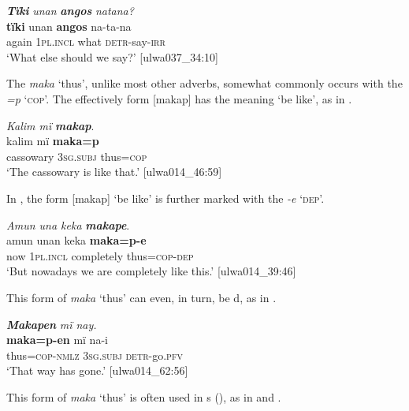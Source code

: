 \ea%
    \label{ex:otherwc:116}
          \textbf{\textit{Tïki}} \textit{unan} \textbf{\textit{angos}} \textit{natana?}\\
\gll    \textbf{tïki}    unan    \textbf{angos}  na-ta-na\\
    again  1\textsc{pl.incl}  what  \textsc{detr}{}-say-\textsc{irr}\\
\glt `What else should we say?’ [ulwa037\_34:10]
\z

The  \textit{maka} ‘thus’, unlike most other adverbs, somewhat commonly occurs with the  \textit{=p} ‘\textsc{cop}’. The effectively  form [makap] has the meaning ‘be like’, as in .

\ea%
    \label{ex:otherwc:117}
          \textit{Kalim mï} \textbf{\textit{makap}}.\\
\gll kalim    mï      \textbf{maka=p}\\
    cassowary  3\textsc{sg.subj}  thus=\textsc{cop}\\
\glt `The cassowary is like that.’ [ulwa014\_46:59]
\z



In , the form [makap] ‘be like’ is further marked with the  \textit{-e} ‘\textsc{dep}’.

\ea%
    \label{ex:otherwc:118}
          \textit{Amun una keka} \textbf{\textit{makape}}.\\
\gll amun  unan    keka      \textbf{maka=p-e}\\
    now  1\textsc{pl.incl}  completely  thus=\textsc{cop-dep}\\
\glt `But nowadays we are completely like this.’ [ulwa014\_39:46]
\z

This  form of \textit{maka} ‘thus’ can even, in turn, be d, as in .

\ea%
    \label{ex:otherwc:119}
          \textbf{\textit{Makapen}} \textit{mï nay.}\\
\gll    \textbf{maka=p-en}    mï      na-i\\
    thus=\textsc{cop-nmlz}  \textsc{3sg.subj}  \textsc{detr-}go.\textsc{pfv}\\
\glt `That way has gone.’ [ulwa014\_62:56]
\z

This  form of \textit{maka} ‘thus’ is often used in s (), as in  and .

